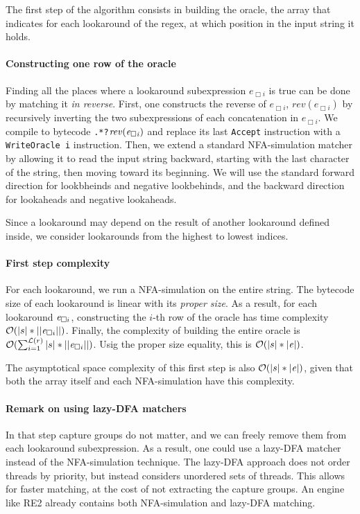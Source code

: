 \documentclass{article}
\def\bytecode#1{\lstinline[style=byt]{#1}}
\def\regex#1{\lstinline[style=rgx]{#1}}
\def\size#1{\ensuremath{|#1|}}
\def\psize#1{\ensuremath{||#1||}}
\def\looknb#1{\ensuremath{\mathcal{L}(#1)}}
\def\bigo{\ensuremath{\mathcal{O}}}
\begin{document}
The first step of the algorithm consists in building the oracle, the array that indicates for each lookaround of the regex, at which position in the input string it holds.

\paragraph{Constructing one row of the oracle}
Finding all the places where a lookaround subexpression $e_{\Box i}$ is true can be done by matching it \textit{in reverse}.
First, one constructs the reverse of $e_{\Box i}$, $\mathit{rev}(e_{\Box i})$ by recursively inverting the two subexpressions of each concatenation in $e_{\Box i}$.
We compile to bytecode \regex{.*?}$\mathit{rev(\mathit{e}_{\Box i})}$ and replace its last \bytecode{Accept} instruction with a \bytecode{WriteOracle i} instruction.
Then, we extend a standard NFA-simulation matcher by allowing it to read the input string backward, starting with the last character of the string, then moving toward its beginning.
We will use the standard forward direction for lookbheinds and negative lookbehinds, and the backward direction for lookaheads and negative lookaheads.

Since a lookaround may depend on the result of another lookaround defined inside, we consider lookarounds from the highest to lowest indices.

\paragraph{First step complexity}
For each lookaround, we run a NFA-simulation on the entire string.
The bytecode size of each lookaround is linear with its \textit{proper size}.
As a result, for each lookaround $\mathit{e}_{\Box i}$, constructing the $i$-th row of the oracle has time complexity $\bigo(\size{s} * \psize{\re_{\Box i}})$.
Finally, the complexity of building the entire oracle is $\bigo(\sum_{i=1}^{\looknb{r}} \size{s} * \psize{\re_{\Box i}})$.
Usig the proper size equality, this is $\bigo(\size{s} * \size{\re})$.

The asymptotical space complexity of this first step is also $\bigo(\size{s} * \size{\re})$, given that both the array itself and each NFA-simulation have this complexity.


\paragraph{Remark on using lazy-DFA matchers}
In that step capture groups do not matter, and we can freely remove them from each lookaround subexpression.
As a result, one could use a lazy-DFA matcher instead of the NFA-simulation technique.
The lazy-DFA approach does not order threads by priority, but instead considers unordered sets of threads.
This allows for faster matching, at the cost of not extracting the capture groups.
An engine like RE2 already contains both NFA-simulation and lazy-DFA matching.
\end{document}
